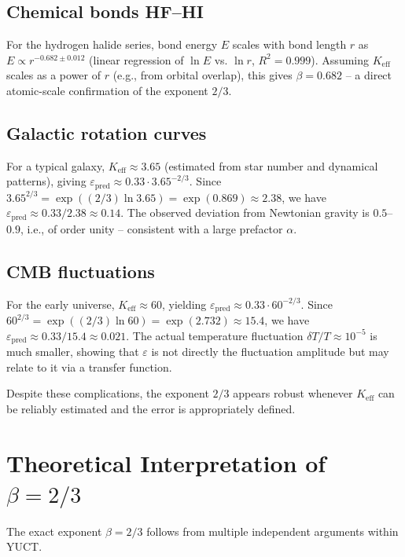 \documentclass[12pt]{article}
\newcommand{\Keff}{K_{\mathrm{eff}}}
\newcommand{\eps}{\varepsilon}
\begin{document}
	\subsection*{Chemical bonds HF--HI}
	For the hydrogen halide series, bond energy \(E\) scales with bond length \(r\) as \(E \propto r^{-0.682 \pm 0.012}\) (linear regression of \(\ln E\) vs. \(\ln r\), \(R^2 = 0.999\)). Assuming \(\Keff\) scales as a power of \(r\) (e.g., from orbital overlap), this gives \(\beta = 0.682\) -- a direct atomic-scale confirmation of the exponent \(2/3\).
	
	\subsection*{Galactic rotation curves}
	For a typical galaxy, \(\Keff \approx 3.65\) (estimated from star number and dynamical patterns), giving \(\eps_{\text{pred}} \approx 0.33 \cdot 3.65^{-2/3}\). Since \(3.65^{2/3} = \exp((2/3)\ln 3.65) = \exp(0.869) \approx 2.38\), we have \(\eps_{\text{pred}} \approx 0.33/2.38 \approx 0.14\). The observed deviation from Newtonian gravity is \(0.5\)--\(0.9\), i.e., of order unity -- consistent with a large prefactor \(\alpha\).
	
	\subsection*{CMB fluctuations}
	For the early universe, \(\Keff \approx 60\), yielding \(\eps_{\text{pred}} \approx 0.33 \cdot 60^{-2/3}\). Since \(60^{2/3} = \exp((2/3)\ln 60) = \exp(2.732) \approx 15.4\), we have \(\eps_{\text{pred}} \approx 0.33/15.4 \approx 0.021\). The actual temperature fluctuation \(\delta T/T \approx 10^{-5}\) is much smaller, showing that \(\eps\) is not directly the fluctuation amplitude but may relate to it via a transfer function.
	
	Despite these complications, the exponent \(2/3\) appears robust whenever \(\Keff\) can be reliably estimated and the error is appropriately defined.
	
	\section{Theoretical Interpretation of \(\beta = 2/3\)}
	\label{sec:derivation}
	
	The exact exponent \(\beta = 2/3\) follows from multiple independent arguments within YUCT.
	
\end{document}
